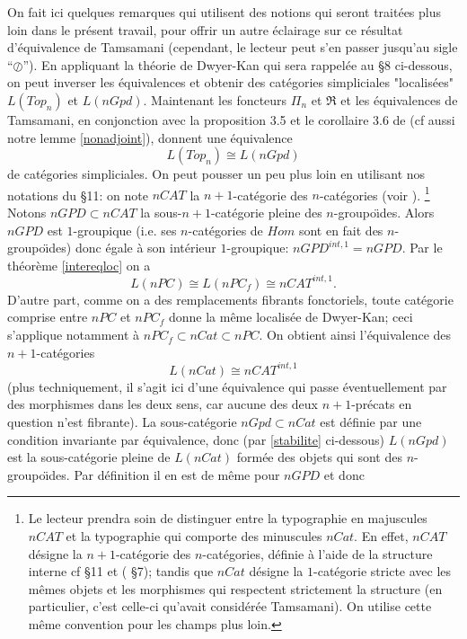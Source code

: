\documentclass[12pt]{article}
\begin{document}
On fait ici quelques remarques qui utilisent des notions qui seront
trait\'ees plus loin dans le pr\'esent travail, pour offrir un autre \'eclairage
sur ce r\'esultat d'\'equivalence de Tamsamani (cependant,
le lecteur peut s'en passer jusqu'au sigle ``$\oslash$'').
En appliquant la
th\'eorie de Dwyer-Kan \cite{DwyerKan3} qui sera rappel\'ee au \S 8
ci-dessous, on peut inverser les \'equivalences et obtenir
des cat\'egories simpliciales "localis\'ees"
$L(Top_n)$ et  $L(nGpd)$.
Maintenant les foncteurs $\Pi _n$ et $\Re$  et
les \'equivalences de Tamsamani, en conjonction avec la proposition 3.5 et le
corollaire 3.6 de \cite{DwyerKan2} (cf aussi notre lemme \ref{nonadjoint}),
donnent une \'equivalence
$$
L(Top_n)\cong L(nGpd )
$$
de cat\'egories simpliciales. On peut pousser un peu plus loin en utilisant
nos notations du \S 11: on note $nCAT$ la $n+1$-cat\'egorie des
$n$-cat\'egories (voir \cite{nCAT}).
\footnote{
Le lecteur prendra soin de distinguer entre la typographie en majuscules $nCAT$
et la typographie qui comporte des minuscules $nCat$.
En effet, $nCAT$ d\'esigne la $n+1$-cat\'egorie des $n$-cat\'egories,
d\'efinie \`a
l'aide de la structure interne cf \S 11 et (\cite{nCAT} \S 7); tandis que
$nCat$ d\'esigne
la $1$-cat\'egorie stricte avec les m\^emes objets et les morphismes qui
respectent
strictement la structure (en particulier, c'est celle-ci qu'avait consid\'er\'ee
Tamsamani). On utilise cette m\^eme convention pour les champs plus loin.}
%
%
%
Notons $nGPD\subset nCAT$  la sous-$n+1$-cat\'egorie pleine des
$n$-groupo\"{\i}des. Alors $nGPD$ est $1$-groupique (i.e. ses
$n$-cat\'egories de
$Hom$ sont en fait des $n$-groupo\"{\i}des) donc \'egale \`a son int\'erieur
$1$-groupique: $nGPD^{int, 1}= nGPD$. Par le th\'eor\`eme \ref{intereqloc}
on a
$$
L(nPC)\cong L(nPC_f)
\cong nCAT ^{int, 1}.
$$
D'autre part, comme on a des remplacements fibrants fonctoriels, toute
cat\'egorie comprise entre $nPC$ et $nPC_f$  donne la m\^eme localis\'ee de
Dwyer-Kan; ceci s'applique notamment \`a $nPC_f \subset nCat \subset nPC$.
On obtient ainsi l'\'equivalence des $n+1$-cat\'egories
$$
L(nCat)\cong nCAT^{int, 1}
$$
(plus techniquement, il s'agit ici d'une \'equivalence qui passe
\'eventuellement par des
morphismes dans les deux sens, car aucune des deux $n+1$-pr\'ecats en
question n'est
fibrante).
La sous-cat\'egorie $nGpd\subset nCat$ est d\'efinie par une condition
invariante par \'equivalence, donc (par \ref{stabilite} ci-dessous) $L(nGpd)$
est la sous-cat\'egorie pleine de $L(nCat)$ form\'ee des objets qui sont des
$n$-groupo\"{\i}des. Par d\'efinition il en est de m\^eme pour $nGPD$ et donc
\end{document}

